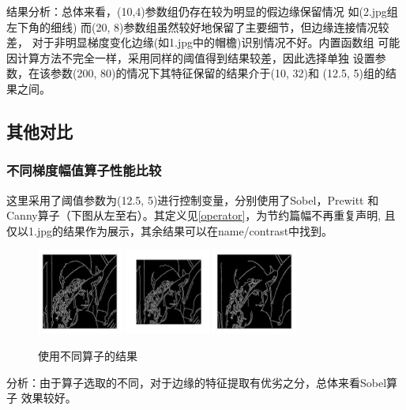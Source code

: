 \documentclass{article}
\begin{document}
\newpage
    结果分析：总体来看，(10,4)参数组仍存在较为明显的假边缘保留情况
    如(2.jpg组左下角的细线)
    而(20, 8)参数组虽然较好地保留了主要细节，但边缘连接情况较差，
    对于非明显梯度变化边缘(如1.jpg中的帽檐)识别情况不好。内置函数组
    可能因计算方法不完全一样，采用同样的阈值得到结果较差，因此选择单独
    设置参数，在该参数(200, 80)的情况下其特征保留的结果介于(10, 32)和
    (12.5, 5)组的结果之间。
    
\subsection{其他对比}
\subsubsection{不同梯度幅值算子性能比较}
    这里采用了阈值参数为(12.5, 5)进行控制变量，分别使用了Sobel，Prewitt
    和Canny算子（下图从左至右）。其定义见\ref{operator}，为节约篇幅不再重复声明,
    且仅以1.jpg的结果作为展示，其余结果可以在name/contrast中找到。

\begin{figure}[h]
    \centering
    \includegraphics[width=0.25\textwidth]{./contrast/1_sobel}
    \includegraphics[width=0.25\textwidth]{./contrast/1_prewitt}
    \includegraphics[width=0.25\textwidth]{./contrast/1_canny}
    \caption{使用不同算子的结果}
\end{figure}

    分析：由于算子选取的不同，对于边缘的特征提取有优劣之分，总体来看Sobel算子
    效果较好。
\end{document}
